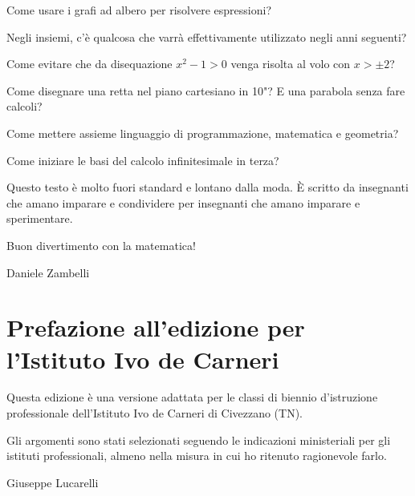 Come usare i grafi ad albero per risolvere espressioni?

Negli insiemi, c'è qualcosa che varrà effettivamente utilizzato negli anni
seguenti?

Come evitare che da disequazione \(x^2-1>0\) venga risolta al volo con
\(x>\pm 2\)?

Come disegnare una retta nel piano cartesiano in 10"? E una parabola senza
fare calcoli?

Come mettere assieme linguaggio di programmazione, matematica e geometria?

Come iniziare le basi del calcolo infinitesimale in terza?

Questo testo è molto fuori standard e lontano dalla moda. È scritto da
insegnanti che amano imparare e condividere per insegnanti che amano
imparare e sperimentare.

Buon divertimento con la matematica!

\begin{flushright}
Daniele Zambelli
\end{flushright}

\section{Prefazione all'edizione per l'Istituto Ivo de Carneri}

Questa edizione è una versione adattata per le classi di biennio d'istruzione professionale dell'Istituto Ivo de Carneri di Civezzano (TN).

Gli argomenti sono stati selezionati seguendo le indicazioni ministeriali per gli istituti professionali, almeno nella misura in cui ho ritenuto ragionevole farlo.

\begin{flushright}
Giuseppe Lucarelli
\end{flushright}


